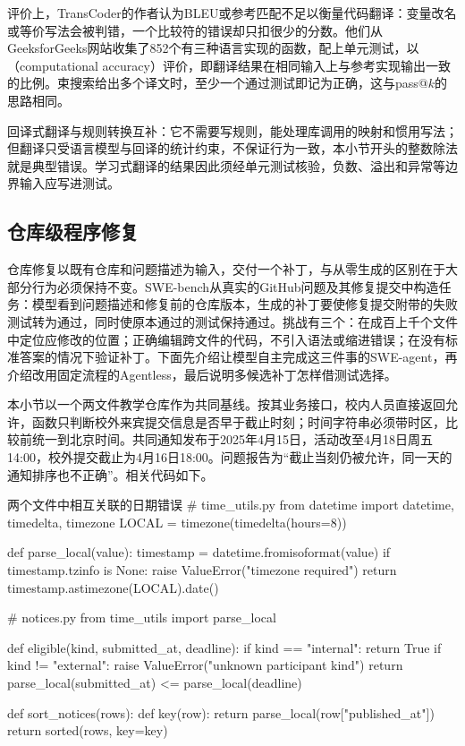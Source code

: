 评价上，TransCoder的作者认为BLEU或参考匹配不足以衡量代码翻译：变量改名或等价写法会被判错，一个比较符的错误却只扣很少的分数。他们从GeeksforGeeks网站收集了852个有三种语言实现的函数，配上单元测试，以（computational accuracy）评价，即翻译结果在相同输入上与参考实现输出一致的比例。束搜索给出多个译文时，至少一个通过测试即记为正确，这与pass@$k$的思路相同。

回译式翻译与规则转换互补：它不需要写规则，能处理库调用的映射和惯用写法；但翻译只受语言模型与回译的统计约束，不保证行为一致，本小节开头的整数除法就是典型错误。学习式翻译的结果因此须经单元测试核验，负数、溢出和异常等边界输入应写进测试。

\subsection{仓库级程序修复}
\label{sec:nlp-execution-repair}

仓库修复以既有仓库和问题描述为输入，交付一个补丁，与从零生成的区别在于大部分行为必须保持不变。SWE-bench从真实的GitHub问题及其修复提交中构造任务：模型看到问题描述和修复前的仓库版本，生成的补丁要使修复提交附带的失败测试转为通过，同时使原本通过的测试保持通过。挑战有三个：在成百上千个文件中定位应修改的位置；正确编辑跨文件的代码，不引入语法或缩进错误；在没有标准答案的情况下验证补丁。下面先介绍让模型自主完成这三件事的SWE-agent，再介绍改用固定流程的Agentless，最后说明多候选补丁怎样借测试选择。

本小节以一个两文件教学仓库作为共同基线。按其业务接口，校内人员直接返回允许，函数只判断校外来宾提交信息是否早于截止时刻；时间字符串必须带时区，比较前统一到北京时间。共同通知发布于2025年4月15日，活动改至4月18日周五14:00，校外提交截止为4月16日18:00。问题报告为“截止当刻仍被允许，同一天的通知排序也不正确”。相关代码如下。

\begin{codeblock}[language=Python,label={code:nlp-execution-repair-base}]{两个文件中相互关联的日期错误}
# time_utils.py
from datetime import datetime, timedelta, timezone
LOCAL = timezone(timedelta(hours=8))

def parse_local(value):
    timestamp = datetime.fromisoformat(value)
    if timestamp.tzinfo is None:
        raise ValueError("timezone required")
    return timestamp.astimezone(LOCAL).date()

# notices.py
from time_utils import parse_local

def eligible(kind, submitted_at, deadline):
    if kind == "internal":
        return True
    if kind != "external":
        raise ValueError("unknown participant kind")
    return parse_local(submitted_at) <= parse_local(deadline)

def sort_notices(rows):
    def key(row):
        return parse_local(row["published_at"])
    return sorted(rows, key=key)
\end{codeblock}

